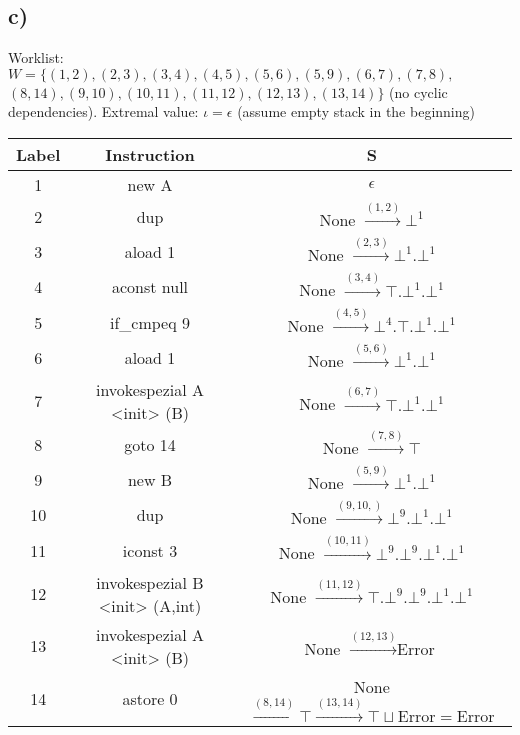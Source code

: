 \documentclass[fleqn,12pt]{article}
\begin{document}
\subsection*{c)}
Worklist: $W = \{ (1,2),(2,3),(3,4),(4,5),(5,6),(5,9),(6,7),(7,8),$\\
$(8,14),(9,10),(10,11),(11,12),(12,13),(13,14) \}$ (no cyclic dependencies).
Extremal value: $\iota = \epsilon$ (assume empty stack in the beginning)\\

\begin{tabular}{c|c|c}
Label & Instruction & S \\ 
\hline 
1 & new A & $\epsilon$ \\ 
2 & dup & None $\overset{(1,2)}{\rightarrow} \bot^1$ \\ 
3 & aload 1 & None $\overset{(2,3)}{\rightarrow} \bot^1.\bot^1$ \\ 
4 & aconst null & None $\overset{(3,4)}{\rightarrow} \top.\bot^1.\bot^1$\\ 
5 & if\_cmpeq 9 & None $\overset{(4,5)}{\rightarrow} \bot^4.\top.\bot^1.\bot^1$\\ 
6 & aload 1 & None $\overset{(5,6)}{\rightarrow} \bot^1.\bot^1$ \\ 
7 & invokespezial A <init> (B) & None $\overset{(6,7)}{\rightarrow} \top.\bot^1.\bot^1$ \\ 
8 & goto 14 & None $\overset{(7,8)}{\rightarrow} \top$\\  
9 & new B & None $\overset{(5,9)}{\rightarrow} \bot^1.\bot^1$\\  
10 & dup & None $\overset{(9,10,)}{\rightarrow} \bot^9.\bot^1.\bot^1$\\  
11 & iconst 3 & None $\overset{(10,11)}{\rightarrow} \bot^9.\bot^9.\bot^1.\bot^1 $\\ 
12 & invokespezial B <init> (A,int) & None $\overset{(11,12)}{\rightarrow} \top.\bot^9.\bot^9.\bot^1.\bot^1 $\\  
13 & invokespezial A <init> (B) & None $\overset{(12,13)}{\rightarrow} \text{Error}$\\  
14 & astore 0 & None $\overset{(8,14)}{\rightarrow} \top \overset{(13,14)}{\rightarrow} \top \sqcup \text{Error} = \text{Error}$\\ 
\end{tabular} 
\end{document}

